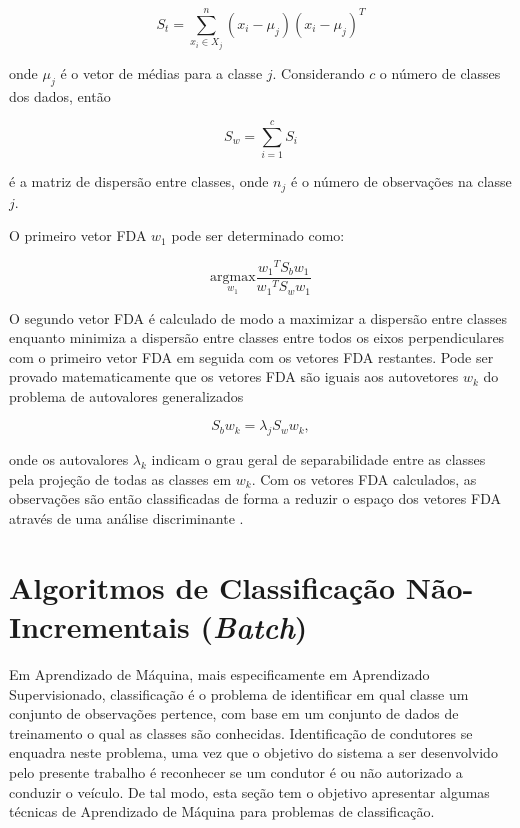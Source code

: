 \begin{equation}
S_t=\sum_{x_i\in X_j}^{n}(x_i - \mu_{j})(x_i - \mu_{j})^T
\end{equation}

\noindent onde $\mu_{j}$ é o vetor de médias para a classe $j$. Considerando $c$ o número de classes dos dados, então

\begin{equation}
S_w=\sum_{i=1}^{c}S_i
\end{equation}

\noindent é a matriz de dispersão entre classes, onde $n_j$ é o número de observações na classe $j$.

O primeiro vetor FDA $w_1$ pode ser determinado como:

\begin{equation}
\underset{w_1}{\textrm{argmax}} \frac{{w_1}^TS_bw_1}{{w_1}^TS_ww_1}
\end{equation}

O segundo vetor FDA é calculado de modo a maximizar a dispersão entre classes enquanto minimiza a dispersão entre classes entre todos os eixos perpendiculares com o primeiro vetor FDA em seguida com os vetores FDA restantes. Pode ser provado matematicamente que os vetores FDA são iguais aos autovetores $w_k$ do problema de autovalores generalizados

\begin{equation}
S_bw_k = \lambda_jS_ww_k,
\end{equation}

\noindent onde os autovalores $\lambda_k$ indicam o grau geral de separabilidade entre as classes pela projeção de todas as classes em $w_k$. Com os vetores FDA calculados, as observações são então classificadas de forma a reduzir o espaço dos vetores FDA através de uma análise discriminante \cite{sugiyama2007dimensionality}.


\section{Algoritmos de Classificação Não-Incrementais (\textit{Batch})}

Em Aprendizado de Máquina, mais especificamente em Aprendizado Supervisionado, classificação é o problema de identificar em qual classe um conjunto de observações pertence, com base em um conjunto de dados de treinamento o qual as classes são conhecidas.  Identificação de condutores se enquadra neste problema, uma vez que o objetivo do sistema a ser desenvolvido pelo presente trabalho é reconhecer se um condutor é ou não autorizado a conduzir o veículo. De tal modo, esta seção tem o objetivo apresentar algumas técnicas de Aprendizado de Máquina para problemas de classificação.


